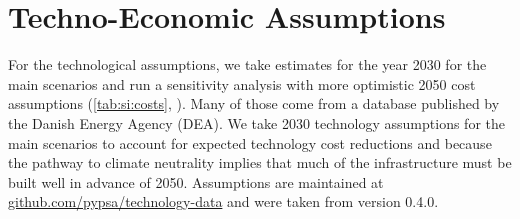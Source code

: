 \section{Techno-Economic Assumptions}
\label{sec:si:costs}

For the technological assumptions, we take estimates for the year 2030 for the
main scenarios and run a sensitivity analysis with more optimistic 2050 cost
assumptions (\cref{tab:si:costs}, ). Many of those
come from a database published by the Danish Energy Agency (DEA). We
take 2030 technology assumptions for the main scenarios to account for expected
technology cost reductions and because the pathway to climate neutrality implies
that much of the infrastructure must be built well in advance of 2050.
Assumptions are maintained at
\href{https://github.com/pypsa/technology-data}{github.com/pypsa/technology-data}
and were taken from version 0.4.0.

\begin{landscape}

\begin{footnotesize}

\end{footnotesize}

\end{landscape}

\restoregeometry